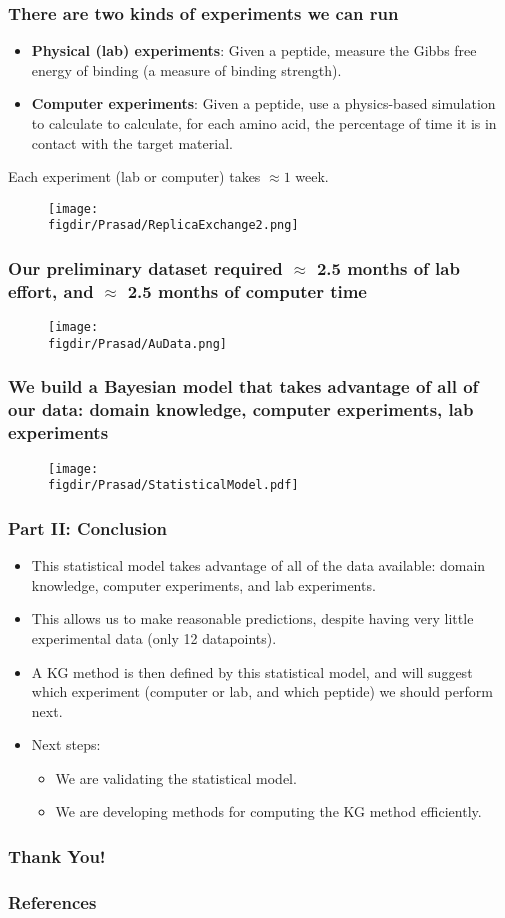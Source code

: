 \documentclass[13pt]{beamer}
\newcommand{\figdir}{../../fig}
\begin{document}
\begin{frame}\frametitle{There are two kinds of experiments we can run} 
  \begin{itemize}
    \item {\bf Physical (lab) experiments}: Given a peptide, measure the Gibbs free energy of binding (a measure of binding strength). 
    \item {\bf Computer experiments}: Given a peptide, use a physics-based simulation to calculate to calculate, for each amino acid, the percentage of time it is in contact with the target material.
  \end{itemize}
  Each experiment (lab or computer) takes $\approx 1$ week.
\begin{figure}\texttt{[image: \\figdir/Prasad/ReplicaExchange2.png]}\end{figure}
\end{frame}

\begin{frame}\frametitle{Our preliminary dataset required $\approx$ 2.5 months of lab effort, and $\approx$ 2.5 months of computer time}
\begin{figure}\texttt{[image: \\figdir/Prasad/AuData.png]}\end{figure}
\end{frame}

\begin{frame}\frametitle{We build a Bayesian model that takes advantage of {\bf all} of our data: domain knowledge, computer experiments, lab experiments}
\begin{figure}\texttt{[image: \\figdir/Prasad/StatisticalModel.pdf]}\end{figure}
\end{frame}

\begin{frame}\frametitle{Part II: Conclusion}
  \begin{itemize}
    \item This statistical model takes advantage of all of the data available: domain knowledge, computer experiments, and lab experiments.
    \item This allows us to make reasonable predictions, despite having very little experimental data (only 12 datapoints).
    \item A KG method is then defined by this statistical model, and will suggest which experiment (computer or lab, and which peptide) we should perform next.
    \item Next steps: 
      \begin{itemize}
	\item We are validating the statistical model.
	\item We are developing methods for computing the KG method efficiently.
      \end{itemize}
  \end{itemize}
\end{frame}




\begin{frame}
\frametitle{Thank You!}
\end{frame}

\begin{frame}[allowframebreaks]
\frametitle{References}
\tiny{
% 


}
\end{frame}
\end{document}
